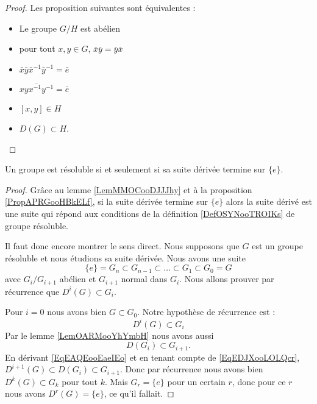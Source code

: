 \begin{proof}
    Les proposition suivantes sont équivalentes :
    \begin{itemize}
        \item Le groupe \( G/H\) est abélien
        \item pour tout \( x,y\in G\), \( \bar x\bar y=\bar y\bar x\)
        \item $\bar x\bar y\bar x^{-1}\bar y^{-1}=\bar e$
        \item \( \overline{ xyx^{-1}y^{-1} }=\bar e\)
        \item \( [x,y]\in H\)
        \item \( D(G)\subset H\).
    \end{itemize}
\end{proof}

\begin{proposition} \label{PropRWYZooTarnmm}
    Un groupe est résoluble si et seulement si sa suite dérivée termine sur \( \{ e \}\).
\end{proposition}

\begin{proof}
    Grâce au lemme \ref{LemMMOCooDJJJhy} et à la proposition \ref{PropAPRGooHBkELf}, si la suite dérivée termine sur \( \{ e \}\) alors la suite dérivé est une suite qui répond aux conditions de la définition \ref{DefOSYNooTROIKs} de groupe résoluble.

    Il faut donc encore montrer le sens direct. Nous supposons que \( G\) est un groupe résoluble et nous étudions sa suite dérivée. Nous avons une suite
    \begin{equation}
        \{ e \}=G_n\subset G_{n-1}\subset\ldots\subset G_1\subset G_0=G
    \end{equation}
    avec \( G_i/G_{i+1}\) abélien et \( G_{i+1}\) normal dans \( G_i\). Nous allons prouver par récurrence que \( D^i(G)\subset G_i\).
    
    Pour \( i=0\) nous avons bien \( G\subset G_0\). Notre hypothèse de récurrence est : 
    \begin{equation}    \label{EqEAQEooEaeIEo}
        D^i(G)\subset G_i
    \end{equation}
    Par le lemme \ref{LemOARMooYhYmbH} nous avons aussi 
    \begin{equation}    \label{EqEDJXooLOLQcr}
        D(G_i)\subset G_{i+1}.
    \end{equation}
    En dérivant \eqref{EqEAQEooEaeIEo} et en tenant compte de \eqref{EqEDJXooLOLQcr}, \( D^{i+1}(G)\subset D(G_i)\subset G_{i+1}\). Donc par récurrence nous avons bien \( D^k(G)\subset G_k\) pour tout \( k\). Mais \( G_r=\{ e \}\) pour un certain \( r\), donc pour ce \( r\) nous avons \( D^r(G)=\{ e \}\), ce qu'il fallait.
\end{proof}

